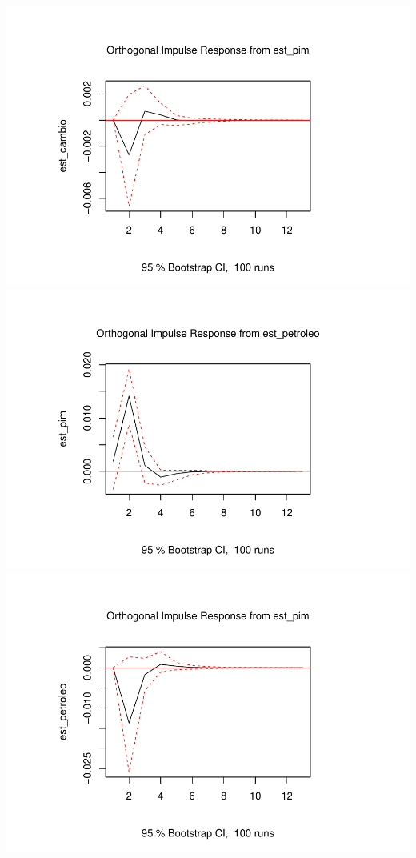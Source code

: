 \documentclass[12pt]{article}
\begin{document}
\includegraphics{article_files/figure-latex/unnamed-chunk-14-10.pdf}
\includegraphics{article_files/figure-latex/unnamed-chunk-14-11.pdf}
\includegraphics{article_files/figure-latex/unnamed-chunk-14-12.pdf}



\end{document}
